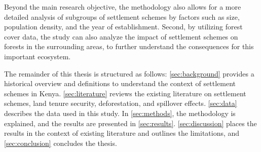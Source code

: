 Beyond the main research objective, the methodology also allows for a more detailed analysis of subgroups of settlement schemes by factors such as size, population density, and the year of establishment.
Second, by utilizing forest cover data, the study can also analyze the impact of settlement schemes on forests in the surrounding areas, to further understand the consequences for this important ecosystem.

The remainder of this thesis is structured as follows: \cref{sec:background} provides a historical overview and definitions to understand the context of settlement schemes in Kenya.
\cref{sec:literature} reviews the existing literature on settlement schemes, land tenure security, deforestation, and spillover effects.
\cref{sec:data} describes the data used in this study. In \cref{sec:methods}, the methodology is explained, and the results are presented in \cref{sec:results}.
\cref{sec:discussion} places the results in the context of existing literature and outlines the limitations, and \cref{sec:conclusion} concludes the thesis.